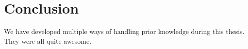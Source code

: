 
\chapter{Conclusion}
\label{chap:conclusion}

We have developed multiple ways of handling prior knowledge during this thesis.
They were all quite awesome.